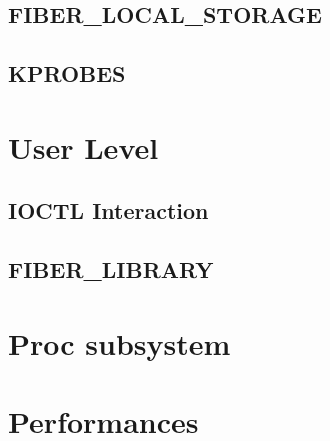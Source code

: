 \documentclass[a4paper]{article}
\begin{document}
\subsection*{FIBER\_LOCAL\_STORAGE}
\subsection*{KPROBES}

\section{User Level}
\subsection*{IOCTL Interaction}
\subsection*{FIBER\_LIBRARY}

\section{Proc subsystem}

\section{Performances}
\end{document}
